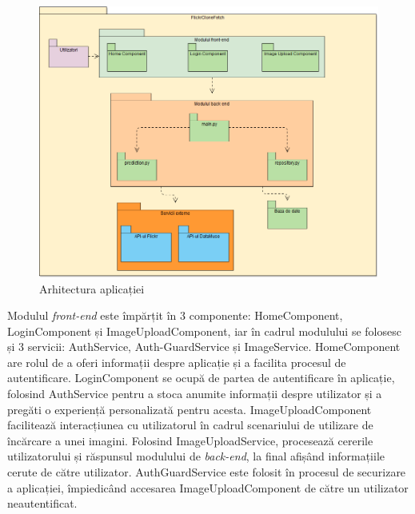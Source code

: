  \begin{figure}[!htbp]
    \begin{center}
        \includegraphics[width=1.0\textwidth]{images/arhitectura.png}
        \caption{Arhitectura aplicației}
    \end{center}
\end{figure}


Modulul \textit{front-end} este împărțit în 3 componente: HomeComponent, LoginComponent și ImageUploadComponent, iar în cadrul modulului se folosesc și 3 servicii: AuthService, Auth-GuardService și ImageService. HomeComponent are rolul de a oferi informații despre aplicație și a facilita procesul de autentificare. LoginComponent se ocupă de partea de autentificare în aplicație, folosind AuthService pentru a stoca anumite informații despre utilizator și a pregăti o experiență personalizată pentru acesta. ImageUploadComponent facilitează interacțiunea cu utilizatorul în cadrul scenariului de utilizare de încărcare a unei imagini. Folosind ImageUploadService, procesează cererile utilizatorului și răspunsul modulului de \textit{back-end}, la final afișând informațiile cerute de către utilizator. AuthGuardService este folosit în procesul de securizare a aplicației, împiedicând accesarea ImageUploadComponent de către un utilizator neautentificat.

